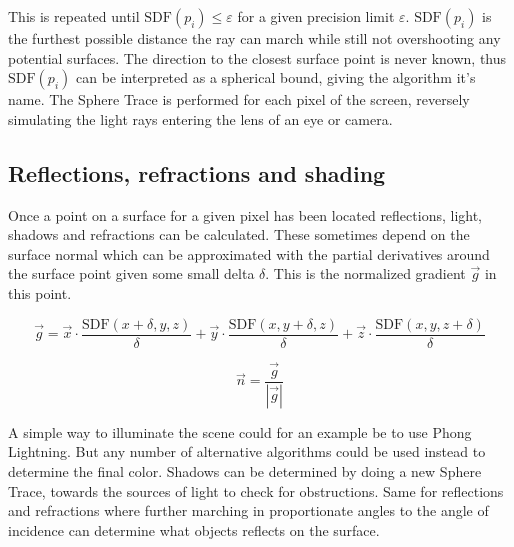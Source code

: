 		This is repeated until $\text{SDF}(p_i) \leq \varepsilon$ for a given
		precision limit $\varepsilon$. $\text{SDF}(p_i)$ is the furthest possible
	 distance the ray can march while still not overshooting any potential
		surfaces. The direction to the closest surface point is never known, thus
		$\text{SDF}(p_i)$ can be interpreted as a spherical bound, giving the
		algorithm it's name. The Sphere Trace is performed for each pixel of the
		screen, reversely simulating the light rays entering the lens of an eye or
		camera.

			\subsection{Reflections, refractions and shading}

				Once a point on a surface for a given pixel has been located
				reflections, light, shadows and refractions can be calculated. These sometimes depend on the surface normal which can be approximated with
				the partial derivatives around the surface point given some small delta
				$\delta$. This is the normalized gradient $\vec{g}$ in this point.

				$$\vec{g} = \vec{x}\cdot\frac{\text{SDF}(x+\delta, y, z)}{\delta} +
				\vec{y}\cdot\frac{\text{SDF}(x, y+\delta, z)}{\delta} +
				\vec{z}\cdot\frac{\text{SDF}(x, y, z+\delta)}{\delta} $$

				$$\vec{n} = \frac{\vec{g}}{|\vec{g}|} $$

				A simple way to illuminate the scene could for an example be to use
				Phong Lightning\cite{Phong1975}. But any number of alternative
				algorithms could be used instead to determine the final color. Shadows
				can be determined by doing a new Sphere Trace, towards the sources of
				light to check for obstructions. Same for reflections and refractions
				where further marching in proportionate angles to the angle of
				incidence can determine what objects reflects on the surface.
